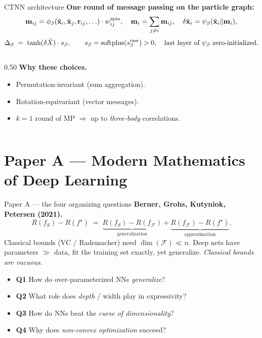 \documentclass[10pt,aspectratio=169]{beamer}
\newcommand{\paperA}[1]{\textcolor{papA}{\textbf{#1}}}
\begin{document}
\begin{frame}{CTNN architecture}
\small
\textbf{One round of message passing on the particle graph:}
\[
  \mathbf m_{ij} = \phi_\beta(\tilde{\mathbf x}_i,\tilde{\mathbf x}_j,\mathbf r_{ij},\ldots)\cdot w^{\rm spin}_{ij},
  \quad \mathbf m_i = \sum_{j\ne i}\mathbf m_{ij},\quad
  \delta\tilde{\mathbf x}_i = \psi_\beta(\tilde{\mathbf x}_i\|\mathbf m_i),
\]
\[
  \Delta_\beta \;=\; \tanh(\delta\tilde X)\cdot s_\beta,\qquad s_\beta = \mathrm{softplus}(s^{\rm raw}_\beta)>0,\quad
  \text{last layer of }\psi_\beta \text{ zero-initialized.}
\]
\begin{columns}[T,onlytextwidth]
\begin{column}{0.50\textwidth}
\textbf{Why these choices.}
\begin{itemize}\setlength\itemsep{1pt}\small
\item Permutation-invariant (sum aggregation).
\item Rotation-equivariant (vector messages).
\item $k{=}1$ round of MP $\Rightarrow$ up to \emph{three-body} correlations.
\end{itemize}
\end{column}
\end{columns}
\end{frame}

\section{Paper A --- Modern Mathematics of Deep Learning}

\begin{frame}{Paper A --- the four organizing questions}
\paperA{Berner, Grohs, Kutyniok, Petersen (2021).}
\small
\[
  R(f_S) - R(f^\star) \;=\; \underbrace{R(f_S)-R(f_{\mathcal F})}_{\text{generalization}}
  + \underbrace{R(f_{\mathcal F})-R(f^\star)}_{\text{approximation}}.
\]
Classical bounds (VC / Rademacher) need $\dim(\mathcal F)\ll n$. Deep nets have parameters $\gg$ data, fit
the training set exactly, yet generalize. \emph{Classical bounds are vacuous.}

\vspace{4pt}
\begin{itemize}\setlength\itemsep{1pt}\small
\item \paperA{Q1} How do over-parameterized NNs \emph{generalize}?
\item \paperA{Q2} What role does \emph{depth} / width play in expressivity?
\item \paperA{Q3} How do NNs beat the \emph{curse of dimensionality}?
\item \paperA{Q4} Why does \emph{non-convex optimization} succeed?
\end{itemize}
\end{frame}
\end{document}
